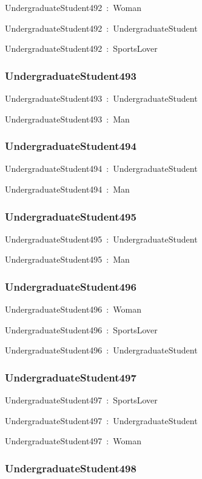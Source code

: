 \documentclass{article}
\begin{document}
UndergraduateStudent492~:~Woman

UndergraduateStudent492~:~UndergraduateStudent

UndergraduateStudent492~:~SportsLover

\subsubsection*{UndergraduateStudent493}

UndergraduateStudent493~:~UndergraduateStudent

UndergraduateStudent493~:~Man

\subsubsection*{UndergraduateStudent494}

UndergraduateStudent494~:~UndergraduateStudent

UndergraduateStudent494~:~Man

\subsubsection*{UndergraduateStudent495}

UndergraduateStudent495~:~UndergraduateStudent

UndergraduateStudent495~:~Man

\subsubsection*{UndergraduateStudent496}

UndergraduateStudent496~:~Woman

UndergraduateStudent496~:~SportsLover

UndergraduateStudent496~:~UndergraduateStudent

\subsubsection*{UndergraduateStudent497}

UndergraduateStudent497~:~SportsLover

UndergraduateStudent497~:~UndergraduateStudent

UndergraduateStudent497~:~Woman

\subsubsection*{UndergraduateStudent498}
\end{document}
